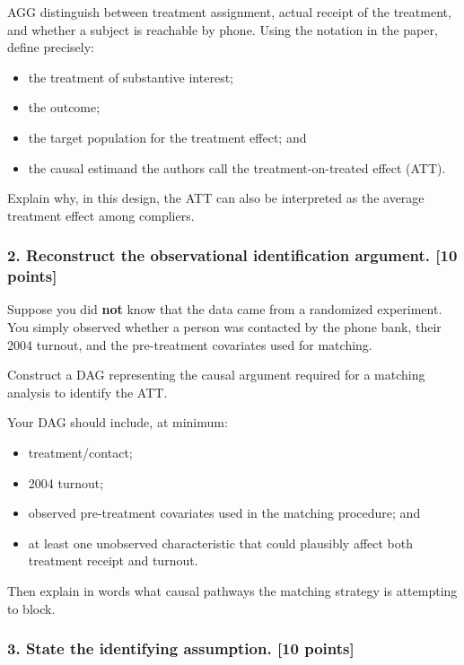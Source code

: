 \documentclass[
]{article}
\providecommand{\tightlist}{%
  \setlength{\itemsep}{0pt}\setlength{\parskip}{0pt}}
\begin{document}
AGG distinguish between treatment assignment, actual receipt of the
treatment, and whether a subject is reachable by phone. Using the
notation in the paper, define precisely:

\begin{itemize}
\tightlist
\item
  the treatment of substantive interest;
\item
  the outcome;
\item
  the target population for the treatment effect; and
\item
  the causal estimand the authors call the treatment-on-treated effect
  (ATT).
\end{itemize}

Explain why, in this design, the ATT can also be interpreted as the
average treatment effect among compliers.

\subsubsection{2. Reconstruct the observational identification argument.
{[}10
points{]}}\label{reconstruct-the-observational-identification-argument.-10-points}

Suppose you did \textbf{not} know that the data came from a randomized
experiment. You simply observed whether a person was contacted by the
phone bank, their 2004 turnout, and the pre-treatment covariates used
for matching.

Construct a DAG representing the causal argument required for a matching
analysis to identify the ATT.

Your DAG should include, at minimum:

\begin{itemize}
\tightlist
\item
  treatment/contact;
\item
  2004 turnout;
\item
  observed pre-treatment covariates used in the matching procedure; and
\item
  at least one unobserved characteristic that could plausibly affect
  both treatment receipt and turnout.
\end{itemize}

Then explain in words what causal pathways the matching strategy is
attempting to block.

\subsubsection{3. State the identifying assumption. {[}10
points{]}}\label{state-the-identifying-assumption.-10-points}
\end{document}
